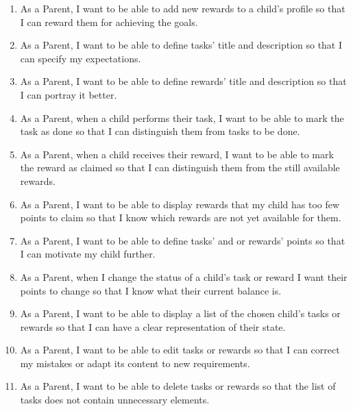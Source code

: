 \begin{enumerate}[label=FR \arabic*.,leftmargin=3\parindent, start=4]
\item\label{fr:parent:rewards-add} As a Parent, I want to be able to add new rewards to a child's profile so that I can reward them for achieving the goals.
\item\label{fr:parent:tasks-content} As a Parent, I want to be able to define tasks' title and description so that I can specify my expectations.
\item\label{fr:parent:rewards-content} As a Parent, I want to be able to define rewards' title and description so that I can portray it better.
\item\label{fr:parent:tasks-confirm} As a Parent, when a child performs their task, I want to be able to mark the task as done so that I can distinguish them from tasks to be done.
\item\label{fr:parent:rewards-confirm} As a Parent, when a child receives their reward, I want to be able to mark the reward as claimed so that I can distinguish them from the still available rewards.
\item\label{fr:parent:rewards-unavailable} As a Parent, I want to be able to display rewards that my child has too few points to claim so that I know which rewards are not yet available for them.
\item\label{fr:parent:tasksrewards-points} As a Parent, I want to be able to define tasks' and or rewards' points so that I can motivate my child further.
\item\label{fr:parent:tasksrewards-change} As a Parent, when I change the status of a child's task or reward I want their points to change so that I know what their current balance is.
\item\label{fr:parent:tasksrewards-list} As a Parent, I want to be able to display a list of the chosen child's tasks or rewards so that I can have a clear representation of their state.
\item\label{fr:parent:tasksrewards-edit} As a Parent, I want to be able to edit tasks or rewards so that I can correct my mistakes or adapt its content to new requirements.
\item\label{fr:parent:tasksrewards-delete} As a Parent, I want to be able to delete tasks or rewards so that the list of tasks does not contain unnecessary elements.
\end{enumerate}


